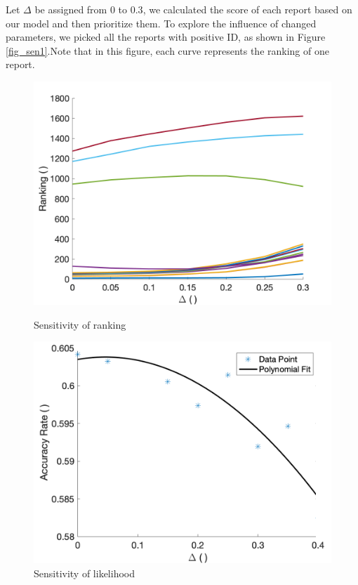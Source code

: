 \documentclass{mcmthesis}
\begin{document}
	Let $\Delta$ be assigned from $0$ to $0.3$, we calculated the score of each report based on our model and then prioritize them. To explore the influence of changed parameters, we picked all the reports with positive ID, as shown in Figure \ref{fig_sen1}.Note that in this figure, each curve represents the ranking of one report.
	\begin{figure}[h]
\begin{minipage}[t]{0.49\linewidth}	
\centering
\includegraphics[width=1.1\textwidth]{sen1.png}	
\caption{Sensitivity of ranking \label{fig_sen1}}  
\end{minipage}
\hfill
\begin{minipage}[t]{0.5\linewidth}
\centering
\includegraphics[width=1.1\textwidth]{sen2}
\caption{Sensitivity of likelihood\label{fig_sen2}}
\end{minipage}
\end{figure}
 
\end{document}
